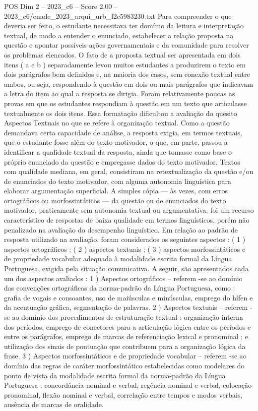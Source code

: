 \begin{textsample}{POS Dim 2 – 2023\_c6 – Score 2.00 – 2023\_c6/enade\_2023\_arqui\_urb\_f2c5983230.txt}
Para compreender o que deveria ser feito, o estudante necessitava ter domínio da leitura e interpretação textual, de modo a entender o enunciado, estabelecer a relação proposta na questão e apontar possíveis ações governamentais e da comunidade para resolver os problemas elencados.
O fato de a proposta textual ser apresentada em dois itens ( a e b ) separadamente levou muitos estudantes a produzirem o texto em dois parágrafos bem definidos e, na maioria dos casos, sem conexão textual entre ambos, ou seja, respondendo à questão em dois ou mais parágrafos que indicavam a letra do item ao qual a resposta se dirigia.
Foram relativamente poucas as provas em que os estudantes respondiam à questão em um texto que articulasse textualmente os dois itens.
Essa formatação dificultou a avaliação do quesito Aspectos Textuais no que se refere à organização textual.
Como a questão demandava certa capacidade de análise, a resposta exigia, em termos textuais, que o estudante fosse além do texto motivador, o que, em parte, passou a identificar a qualidade textual da resposta, ainda que tomasse como base o próprio enunciado da questão e empregasse dados do texto motivador.
Textos com qualidade mediana, em geral, consistiram na retextualização da questão e/ou de enunciados do texto motivador, com alguma autonomia linguística para elaborar argumentação superficial.
A simples cópia — às vezes, com erros ortográficos ou morfossintáticos — da questão ou de enunciados do texto motivador, praticamente sem autonomia textual ou argumentativa, foi um recurso característico de respostas de baixa qualidade em termos linguísticos, porém não penalizado na avaliação do desempenho linguístico.
Em relação ao padrão de resposta utilizado na avaliação, foram considerados os seguintes aspectos : ( 1 ) aspectos ortográficos ; ( 2 ) aspectos textuais ; ( 3 ) aspectos morfossintáticos e de propriedade vocabular adequada à modalidade escrita formal da Língua Portuguesa, exigida pela situação comunicativa.
A seguir, são apresentados cada um dos aspectos avaliados : 1 ) Aspectos ortográficos – referem -se ao domínio das convenções ortográficas da norma-padrão da Língua Portuguesa, como : grafia de vogais e consoantes, uso de maiúsculas e minúsculas, emprego do hífen e da acentuação gráfica, segmentação de palavras. 2 ) Aspectos textuais – referem -se ao domínio dos procedimentos de estruturação textual : organização interna dos períodos, emprego de conectores para a articulação lógica entre os períodos e entre os parágrafos, emprego de marcas de referenciação lexical e pronominal ; e utilização dos sinais de pontuação que contribuem para a organização lógica da frase. 3 ) Aspectos morfossintáticos e de propriedade vocabular – referem -se ao domínio das regras de caráter morfossintático estabelecidas como modelares do ponto de vista da modalidade escrita formal da norma-padrão da Língua Portuguesa : concordância nominal e verbal, regência nominal e verbal, colocação pronominal, flexão nominal e verbal, correlação entre tempos e modos verbais, ausência de marcas de oralidade.

\end{textsample}
